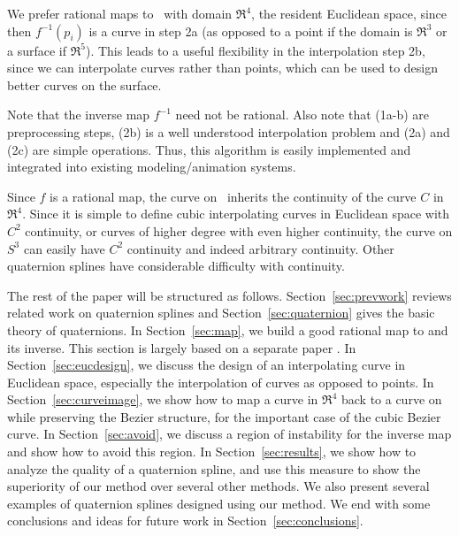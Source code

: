 \clearpage
\onecolumn

We prefer rational maps to \ with domain $\Re^4$, the resident
Euclidean space, since then $f^{-1}(p_i)$ is a curve in step 2a
(as opposed to a point if the domain is $\Re^3$ or a surface if $\Re^5$).
This leads to a useful flexibility in the interpolation step 2b,
since we can interpolate curves rather than points,
which can be used to design better curves on the surface.

Note that the inverse map $f^{-1}$ need not be rational.
Also note that (1a-b) are preprocessing steps,
(2b) is a well understood interpolation problem
and (2a) and (2c) are simple operations.
Thus, this algorithm is easily implemented and integrated into
existing modeling/animation systems.

Since $f$ is a rational map,
the curve on \ inherits the continuity of the curve $C$ in $\Re^4$.
Since it is simple to define cubic interpolating curves
in Euclidean space with $C^2$ continuity, or curves of higher degree with
even higher continuity, the curve on $S^3$ can easily have $C^2$ continuity
and indeed arbitrary continuity.
Other quaternion splines have considerable difficulty with continuity.

The rest of the paper will be structured as follows.
Section~\ref{sec:prevwork} reviews related work on quaternion splines
and Section~\ref{sec:quaternion} gives the basic theory of quaternions.
In Section~\ref{sec:map}, we build a good rational map to  and its inverse.
This section is largely based on a separate paper \cite{jj98a}.
In Section~\ref{sec:eucdesign},
we discuss the design of an interpolating curve in Euclidean space,
especially the interpolation of curves as opposed to points. 
In Section~\ref{sec:curveimage}, we show how to map a curve in $\Re^4$
back to a curve on  while preserving the Bezier structure,
for the important case of the cubic Bezier curve.
In Section~\ref{sec:avoid}, we discuss a region of instability 
for the inverse map and show how to avoid this region.
In Section~\ref{sec:results}, we show how to analyze the quality of a 
quaternion spline, and use this measure to show the superiority
of our method over several other methods.
We also present several examples of quaternion splines designed
using our method.
We end with some conclusions and ideas for future work in 
Section~\ref{sec:conclusions}.

